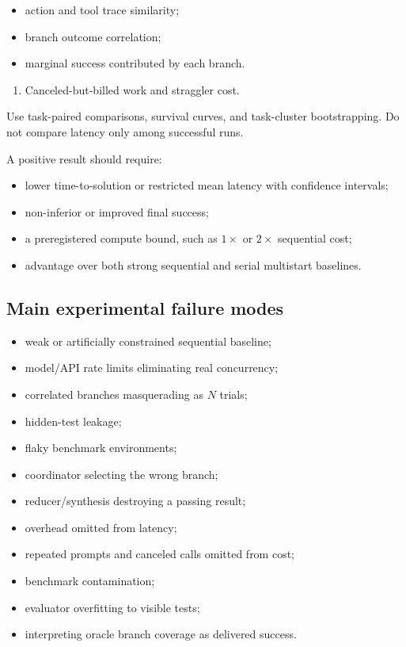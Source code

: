 \documentclass[
  letterpaper,
]{article}
\providecommand{\tightlist}{%
  \setlength{\itemsep}{0pt}\setlength{\parskip}{0pt}}
\begin{document}
\begin{itemize}
\tightlist
\item
  action and tool trace similarity;
\item
  branch outcome correlation;
\item
  marginal success contributed by each branch.
\end{itemize}

\begin{enumerate}
\def\labelenumi{\arabic{enumi}.}
\setcounter{enumi}{10}
\tightlist
\item
  Canceled-but-billed work and straggler cost.
\end{enumerate}

Use task-paired comparisons, survival curves, and task-cluster bootstrapping. Do not compare latency only among successful runs.

A positive result should require:

\begin{itemize}
\tightlist
\item
  lower time-to-solution or restricted mean latency with confidence intervals;
\item
  non-inferior or improved final success;
\item
  a preregistered compute bound, such as \(1\times\) or \(2\times\) sequential cost;
\item
  advantage over both strong sequential and serial multistart baselines.
\end{itemize}

\subsection{Main experimental failure modes}\label{main-experimental-failure-modes}

\begin{itemize}
\tightlist
\item
  weak or artificially constrained sequential baseline;
\item
  model/API rate limits eliminating real concurrency;
\item
  correlated branches masquerading as \(N\) trials;
\item
  hidden-test leakage;
\item
  flaky benchmark environments;
\item
  coordinator selecting the wrong branch;
\item
  reducer/synthesis destroying a passing result;
\item
  overhead omitted from latency;
\item
  repeated prompts and canceled calls omitted from cost;
\item
  benchmark contamination;
\item
  evaluator overfitting to visible tests;
\item
  interpreting oracle branch coverage as delivered success.
\end{itemize}
\end{document}
